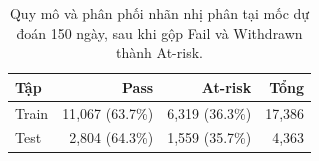 \begin{table}[H]
  \centering
  \caption{Quy mô và phân phối nhãn nhị phân tại mốc dự đoán 150 ngày, sau khi gộp Fail và Withdrawn thành At-risk.}
  \label{tab:split_t150}
  \begin{tabular}{lrrr}
    \toprule
    \textbf{Tập} & \textbf{Pass} & \textbf{At-risk} & \textbf{Tổng} \\
    \midrule
    Train & 11{,}067 (63.7\%) & 6{,}319 (36.3\%) & 17{,}386 \\
    Test  & 2{,}804 (64.3\%) & 1{,}559 (35.7\%) & 4{,}363 \\
    \bottomrule
  \end{tabular}
\end{table}
